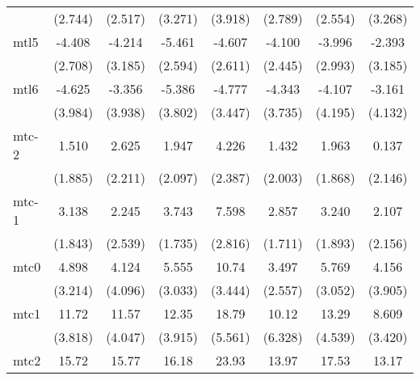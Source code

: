 \documentclass{article}
\begin{document}
{\begin{longtable}{l*{7}{c}}
                &  (2.744)         &  (2.517)         &  (3.271)         &  (3.918)         &  (2.789)         &  (2.554)         &  (3.268)         \\
mtl5            &   -4.408         &   -4.214         &   -5.461         &   -4.607         &   -4.100         &   -3.996         &   -2.393         \\
                &  (2.708)         &  (3.185)         &  (2.594)         &  (2.611)         &  (2.445)         &  (2.993)         &  (3.185)         \\
mtl6            &   -4.625         &   -3.356         &   -5.386         &   -4.777         &   -4.343         &   -4.107         &   -3.161         \\
                &  (3.984)         &  (3.938)         &  (3.802)         &  (3.447)         &  (3.735)         &  (4.195)         &  (4.132)         \\
mtc-2           &    1.510         &    2.625         &    1.947         &    4.226         &    1.432         &    1.963         &    0.137         \\
                &  (1.885)         &  (2.211)         &  (2.097)         &  (2.387)         &  (2.003)         &  (1.868)         &  (2.146)         \\
mtc-1           &    3.138         &    2.245         &    3.743         &    7.598\sym{*}  &    2.857         &    3.240         &    2.107         \\
                &  (1.843)         &  (2.539)         &  (1.735)         &  (2.816)         &  (1.711)         &  (1.893)         &  (2.156)         \\
mtc0            &    4.898         &    4.124         &    5.555         &    10.74\sym{*}  &    3.497         &    5.769         &    4.156         \\
                &  (3.214)         &  (4.096)         &  (3.033)         &  (3.444)         &  (2.557)         &  (3.052)         &  (3.905)         \\
mtc1            &    11.72\sym{*}  &    11.57\sym{*}  &    12.35\sym{*}  &    18.79\sym{*}  &    10.12         &    13.29\sym{*}  &    8.609         \\
                &  (3.818)         &  (4.047)         &  (3.915)         &  (5.561)         &  (6.328)         &  (4.539)         &  (3.420)         \\
mtc2            &    15.72\sym{***}&    15.77\sym{***}&    16.18\sym{***}&    23.93\sym{**} &    13.97\sym{*}  &    17.53\sym{**} &    13.17\sym{**} \\

\end{longtable}}
\end{document}
